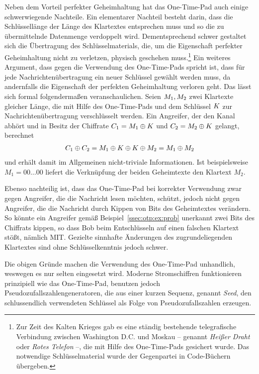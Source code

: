 Neben dem Vorteil perfekter Geheimhaltung hat das One-Time-Pad auch
einige schwerwiegende Nachteile. Ein elementarer Nachteil besteht darin,
dass die Schlüssellänge der Länge des Klartextes entsprechen muss und so
die zu übermittelnde Datenmenge verdoppelt wird. Dementsprechend schwer
gestaltet sich die Übertragung des Schlüsselmaterials, die, um die
Eigenschaft perfekter Geheimhaltung nicht zu verletzen, physisch
geschehen muss.\footnote{Zur Zeit des Kalten Krieges gab es eine ständig
  bestehende telegrafische Verbindung zwischen Washington D.C. und
  Moskau -- genannt \emph{Heißer Draht} oder \emph{Rotes Telefon} --,
  die mit Hilfe des One-Time-Pads gesichert wurde. Das notwendige
  Schlüsselmaterial wurde der Gegenpartei in Code-Büchern übergeben.} 
Ein weiteres Argument, dass gegen die Verwendung des One-Time-Pads
spricht ist, dass für jede Nachrichtenübertragung ein neuer Schlüssel
gewählt werden muss, da andernfalls die Eigenschaft der perfekten
Geheimhaltung verloren geht. Das lässt sich formal folgendermaßen
veranschaulichen. Seien $M_{1}, M_{2}$ zwei Klartexte
gleicher Länge, die mit Hilfe des One-Time-Pads und dem Schlüssel $K$
zur Nachrichtenübertragung verschlüsselt werden. Ein Angreifer, der den
Kanal abhört und in Besitz der Chiffrate $C_{1} = M_{1}
\oplus K$ und $C_{2} = M_{2} \oplus K$ gelangt,
berechnet 
\begin{align*}
  C_{1} \oplus C_{2} = M_{1} \oplus K \oplus K
  \oplus M_{2} = M_{1} \oplus M_{2} 
\end{align*}
und erhält damit im Allgemeinen nicht-triviale Informationen. Ist
beispielsweise $M_{1} = 00\dots00$ liefert die Verknüpfung der beiden
Geheimtexte den Klartext $M_{2}$.  

Ebenso nachteilig ist, dass das One-Time-Pad bei korrekter Verwendung
zwar gegen Angreifer, die die Nachricht lesen möchten, schützt, jedoch
nicht gegen Angreifer, die die Nachricht durch Kippen von Bits des
Geheimtextes verändern. So könnte ein Angreifer gemäß
Beispiel~\ref{ssec:otp:ex:prob} unerkannt zwei Bits des Chiffrats
kippen, so dass Bob beim Entschlüsseln auf einen falschen Klartext
stößt, nämlich MIT. Gezielte sinnhafte Änderungen des zugrundeliegenden
Klartextes sind ohne Schlüsselkenntnis jedoch schwer.  

Die obigen Gründe machen die Verwendung des One-Time-Pad unhandlich,
weswegen es nur selten eingesetzt wird. Moderne Stromschiffren
funktionieren prinzipiell wie das One-Time-Pad, benutzen jedoch
Pseudozufallszahlengeneratoren\indexPRNG, die aus einer kurzen Sequenz,
genannt \emph{Seed}\indexSeed, den schlussendlich verwendeten Schlüssel
als Folge von Pseudozufallszahlen erzeugen. 

